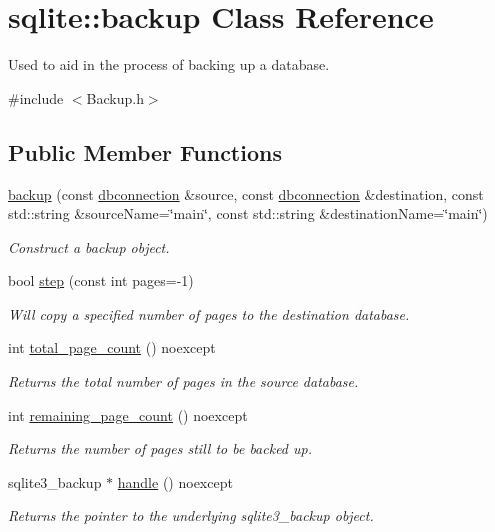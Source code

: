 \hypertarget{a00001}{\section{sqlite\-:\-:backup Class Reference}
\label{a00001}
}


Used to aid in the process of backing up a database.  




{\ttfamily \#include $<$Backup.\-h$>$}

\subsection*{Public Member Functions}
\begin{DoxyCompactItemize}
\item 
\hyperlink{a00001_a62932f9aa6d1a5e313615cc5ca4f67fe}{backup} (const \hyperlink{a00004}{dbconnection} \&source, const \hyperlink{a00004}{dbconnection} \&destination, const std\-::string \&source\-Name=\char`\"{}main\char`\"{}, const std\-::string \&destination\-Name=\char`\"{}main\char`\"{})
\begin{DoxyCompactList}\small\item\em Construct a backup object. \end{DoxyCompactList}\item 
bool \hyperlink{a00001_aba1c8a938a261ced48d3c01cf8da7676}{step} (const int pages=-\/1)
\begin{DoxyCompactList}\small\item\em Will copy a specified number of pages to the destination database. \end{DoxyCompactList}\item 
int \hyperlink{a00001_ab6d84e51fef3125dd3829d35e24b02a7}{total\-\_\-page\-\_\-count} () noexcept
\begin{DoxyCompactList}\small\item\em Returns the total number of pages in the source database. \end{DoxyCompactList}\item 
int \hyperlink{a00001_a9da6a7da53bdd43839024ab13ae72258}{remaining\-\_\-page\-\_\-count} () noexcept
\begin{DoxyCompactList}\small\item\em Returns the number of pages still to be backed up. \end{DoxyCompactList}\item 
\hypertarget{a00001_a556162efdf4055ab73275fcaa345c981}{sqlite3\-\_\-backup $\ast$ \hyperlink{a00001_a556162efdf4055ab73275fcaa345c981}{handle} () noexcept}\label{a00001_a556162efdf4055ab73275fcaa345c981}

\begin{DoxyCompactList}\small\item\em Returns the pointer to the underlying sqlite3\-\_\-backup object. \end{DoxyCompactList}\end{DoxyCompactItemize}


